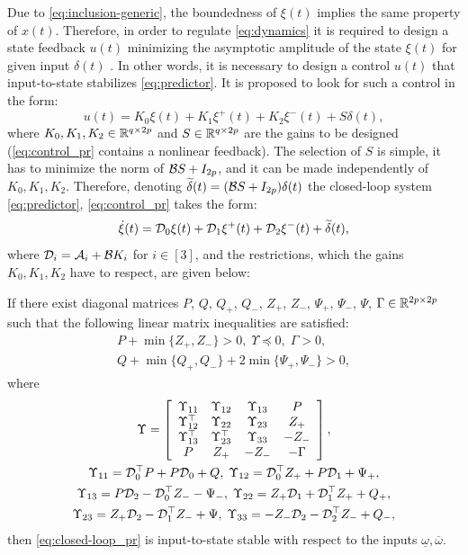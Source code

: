 \documentclass[letterpaper, 10 pt, conference]{ieeeconf}  %
\begin{document}
Due to \eqref{eq:inclusion-generic}, the boundedness of $\xi(t)$
implies the same property of $x(t)$. Therefore, in order to regulate
\eqref{eq:dynamics} it is required to design a state feedback $u(t)$
minimizing the asymptotic amplitude of the state $\xi(t)$ for given
input $\delta(t)$ \cite{Efimov2013a}. In other words, it is necessary
to design a control $u(t)$ that input-to-state stabilizes \eqref{eq:predictor}.
It is proposed to look for such a control in the form:
\begin{equation}
u(t)=K_{0}\xi(t)+K_{1}\xi^{+}(t)+K_{2}\xi^{-}(t)+S\delta(t),\label{eq:control_pr}
\end{equation}
where $K_{0},K_{1},K_{2}\in\mathbb{R}^{q\times2p}$ and $S\in\mathbb{R}^{q\times2p}$
are the gains to be designed (\eqref{eq:control_pr} contains a nonlinear
feedback). The selection of $S$ is simple, it has to minimize the
norm of $\mathcal{B} S+I_{2p}$, and it can be made independently of $K_{0},K_{1},K_{2}$.
Therefore, denoting $\widetilde{\delta}(t)=(\mathcal{B} S+I_{2p})\delta(t)$ the
closed-loop system \eqref{eq:predictor}, \eqref{eq:control_pr} takes
the form:
\begin{equation}
\dot{\xi}(t)=\mathcal{D}_{0}\xi(t)+\mathcal{D}_{1}\xi^{+}(t)+\mathcal{D}_{2}\xi^{-}(t)+\widetilde{\delta}(t),\label{eq:closed-loop_pr}
\end{equation}
where $\mathcal{D}_{i}=\mathcal{A}_{i}+\mathcal{B} K_{i}$ for $i\in[3]$, and the restrictions,
which the gains $K_{0},K_{1},K_{2}$ have to respect, are given below:
\begin{theorem}
\label{thm:ISS_pr} If there exist diagonal matrices $P$, $Q$, $Q_{+}$,
$Q_{-}$, $Z_{+}$, $Z_{-}$, $\Psi_{+}$, $\Psi_{-}$, $\Psi$, $\Gamma\in\mathbb{R}^{2p\times2p}$
such that the following linear matrix inequalities are satisfied:
\begin{gather*}
P+\min\{Z_{+},Z_{-}\}>0,\;\Upsilon\preceq0,\;\Gamma>0,\\
Q+\min\{Q_{+},Q_{-}\}+2\min\{\Psi_{+},\Psi_{-}\}>0,
\end{gather*}
where
\begin{gather*}
\Upsilon=\left[\begin{array}{cccc}
\Upsilon_{11} & \Upsilon_{12} & \Upsilon_{13} & P\\
\Upsilon_{12}^{\top} & \Upsilon_{22} & \Upsilon_{23} & Z_{+}\\
\Upsilon_{13}^{\top} & \Upsilon_{23}^{\top} & \Upsilon_{33} & -Z_{-}\\
P & Z_{+} & -Z_{-} & -\Gamma
\end{array}\right],\\
\Upsilon_{11}=\mathcal{D}_{0}^{\top}P+P\mathcal{D}_{0}+Q,\;\Upsilon_{12}=\mathcal{D}_{0}^{\top}Z_{+}+P\mathcal{D}_{1}+\Psi_{+},\\
\Upsilon_{13}=P\mathcal{D}_{2}-\mathcal{D}_{0}^{\top}Z_{-}-\Psi_{-},\;\Upsilon_{22}=Z_{+}\mathcal{D}_{1}+\mathcal{D}_{1}^{\top}Z_{+}+Q_{+},\\
\Upsilon_{23}=Z_{+}\mathcal{D}_{2}-\mathcal{D}_{1}^{\top}Z_{-}+\Psi,\;\Upsilon_{33}=-Z_{-}\mathcal{D}_{2}-\mathcal{D}_{2}^{\top}Z_{-}+Q_{-},
\end{gather*}
then \eqref{eq:closed-loop_pr} is input-to-state stable with respect
to the inputs $\underline{\omega},\overline{\omega}$.
\end{theorem}
\end{document}
